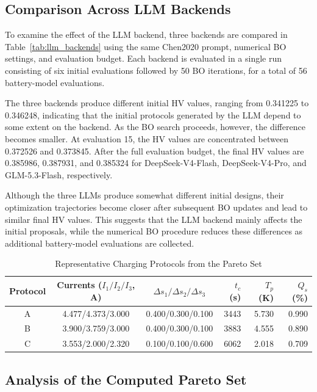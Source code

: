 \documentclass[lettersize,journal]{IEEEtran}
\begin{document}
\subsection{Comparison Across LLM Backends}

\label{sec:llm_backends}

To examine the effect of the LLM backend, three backends are compared in
Table~\ref{tab:llm_backends} using the same Chen2020 prompt, numerical BO
settings, and evaluation budget. Each backend is evaluated in a single run consisting
of six initial evaluations followed by 50 BO iterations, for a total of 56
battery-model evaluations.

The three backends produce different initial HV values, ranging from
0.341225 to 0.346248, indicating that the initial protocols generated by
the LLM depend to some extent on the backend. As the BO search proceeds,
however, the difference becomes smaller. At evaluation 15, the HV values
are concentrated between 0.372526 and 0.373845. After the full evaluation
budget, the final HV values are 0.385986, 0.387931, and 0.385324 for
DeepSeek-V4-Flash, DeepSeek-V4-Pro, and GLM-5.3-Flash, respectively.

Although the three LLMs produce somewhat different initial designs, their
optimization trajectories become closer after subsequent BO updates and
lead to similar final HV values. This suggests that the LLM backend mainly
affects the initial proposals, while the numerical BO procedure reduces
these differences as additional battery-model evaluations are collected.

\begin{table}[!t]
\caption{Representative Charging Protocols from the Pareto Set}
\label{tab:representative_protocols}
\centering
\scriptsize
\setlength{\tabcolsep}{2.5pt}
\begin{tabular}{@{}c c c r r r@{}}
\toprule
Protocol & Currents ($I_1/I_2/I_3$, A) & $\Delta s_1/\Delta s_2/\Delta s_3$ &
$t_c$ (s) & $T_p$ (K) & $Q_s$ (\%) \\
\midrule
A & 4.477/4.373/3.000 & 0.400/0.300/0.100 & 3443 & 5.730 & 0.990 \\
B & 3.900/3.759/3.000 & 0.400/0.300/0.100 & 3883 & 4.555 & 0.890 \\
C & 3.553/2.000/2.320 & 0.100/0.100/0.600 & 6062 & 2.018 & 0.709 \\
\bottomrule
\end{tabular}
\end{table}

\subsection{Analysis of the Computed Pareto Set}
\end{document}
